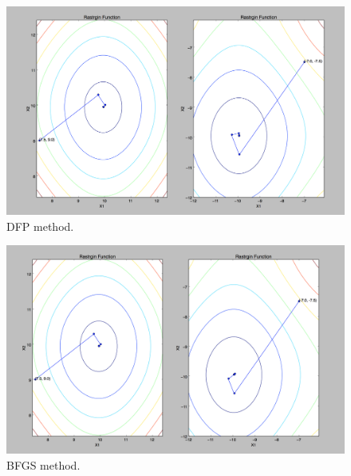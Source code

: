 \documentclass{article}
\begin{document}
\begin{figure}[h]
\includegraphics[width=\textwidth]{image/DFP_method}
\centering
\caption{DFP method. } 
\end{figure} 

\begin{figure}[h]
\includegraphics[width=\textwidth]{image/BFGS_method}
\centering
\caption{BFGS method. }
\end{figure} 
\end{document}
